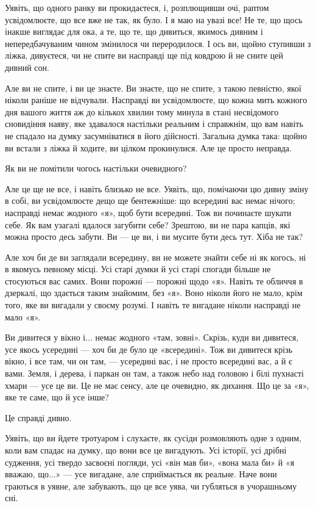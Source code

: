 Уявіть, що одного ранку ви прокидаєтеся, і, розплющивши очі, раптом усвідомлюєте, що все вже не так, як було. І я маю на увазі все! Не те, що щось інакше виглядає для ока, а те, що те, що дивиться, якимось дивним і непередбачуваним чином змінилося чи переродилося. І ось ви, щойно ступивши з ліжка, дивуєтеся, чи не спите ви насправді ще під ковдрою й не сните цей дивний сон.

Але ви не спите, і ви це знаєте. Ви знаєте, що не спите, з такою певністю, якої ніколи раніше не відчували. Насправді ви усвідомлюєте, що кожна мить кожного дня вашого життя аж до кількох хвилин тому минула в стані несвідомого сновидіння наяву, яке здавалося настільки реальним і справжнім, що вам навіть не спадало на думку засумніватися в його дійсності. Загальна думка така: щойно ви встали з ліжка й ходите, ви цілком прокинулися. Але це просто неправда.

Як ви не помітили чогось настільки очевидного?

Але це ще не все, і навіть близько не все. Уявіть, що, помічаючи цю дивну зміну в собі, ви усвідомлюєте дещо ще бентежніше: що всередині вас немає нічого; насправді немає жодного «я», щоб бути всередині. Тож ви починаєте шукати себе. Як вам узагалі вдалося загубити себе? Зрештою, ви не пара капців, які можна просто десь забути. Ви — це ви, і ви мусите бути десь тут. Хіба не так?

Але хоч би де ви заглядали всередину, ви не можете знайти себе ні як когось, ні в якомусь певному місці. Усі старі думки й усі старі спогади більше не стосуються вас самих. Вони порожні — порожні щодо «я». Навіть те обличчя в дзеркалі, що здається таким знайомим, без «я». Воно ніколи його не мало, крім того, яке ви вигадали у своєму розумі. І навіть те вигадане ніколи насправді не мало «я».

Ви дивитеся у вікно і... немає жодного «там, зовні». Скрізь, куди ви дивитеся, усе якось усередині — хоч би де було це «всередині». Тож ви дивитеся крізь вікно, і все там, чи он там, — усередині вас, і не просто всередині вас, а й є вами. Земля, і дерева, і паркан он там, а також небо над головою і білі пухнасті хмари — усе це ви. Це не має сенсу, але це очевидно, як дихання. Що це за «я», яке те саме, що й усе інше?

Це справді дивно.

Уявіть, що ви йдете тротуаром і слухаєте, як сусіди розмовляють одне з одним, коли вам спадає на думку, що вони все це вигадують. Усі історії, усі дрібні судження, усі твердо засвоєні погляди, усі «він мав би», «вона мала би» й «я вважаю, що...» — усе вигадане, але сприймається як реальне. Наче вони граються в уявне, але забувають, що це все уява, чи губляться в учорашньому сні.

